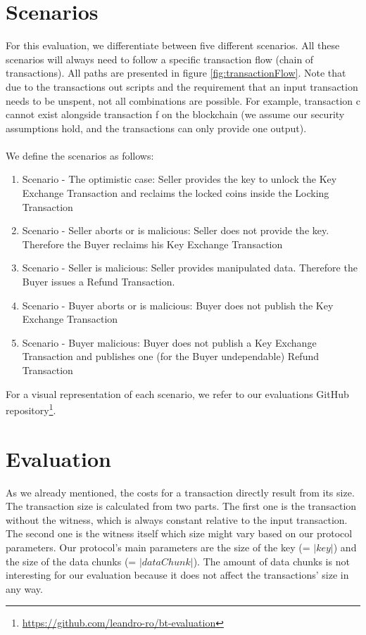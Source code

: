 \documentclass{cacthesis}
\newcounter{protocol}
\begin{document}
	    \section{Scenarios}
	    For this evaluation, we differentiate between five different scenarios. All these scenarios will always need to follow a specific transaction flow (chain of transactions). All paths are presented in figure \ref{fig:transactionFlow}. Note that due to the transactions out scripts and the requirement that an input transaction needs to be unspent, not all combinations are possible. For example, transaction c cannot exist alongside transaction f on the blockchain (we assume our security assumptions hold, and the transactions can only provide one output).
	    \\\\
	    We define the scenarios as follows:
	    \begin{enumerate}
            \item Scenario - The optimistic case: Seller provides the key to unlock the Key Exchange Transaction and reclaims the locked coins inside the Locking Transaction

            \item Scenario - Seller aborts or is malicious: Seller does not provide the key. Therefore the Buyer reclaims his Key Exchange Transaction

            \item Scenario - Seller is malicious: Seller provides manipulated data. Therefore the Buyer issues a Refund Transaction.
            
            \item Scenario - Buyer aborts or is malicious: Buyer does not publish the Key Exchange Transaction
            
            \item Scenario - Buyer malicious: Buyer does not publish a Key Exchange Transaction and publishes one (for the Buyer undependable) Refund Transaction
        \end{enumerate}
	    For a visual representation of each scenario, we refer to our evaluations GitHub repository\footnote{\url{https://github.com/leandro-ro/bt-evaluation}}.
	    
	    
	    \section{Evaluation}
	    As we already mentioned, the costs for a transaction directly result from its size. The transaction size is calculated from two parts. The first one is the transaction without the witness, which is always constant relative to the input transaction. The second one is the witness itself which size might vary based on our protocol parameters. Our protocol's main parameters are the size of the key (= $|key|$) and the size of the data chunks (= $|dataChunk|$). The amount of data chunks is not interesting for our evaluation because it does not affect the transactions' size in any way. 
	    
\end{document}

